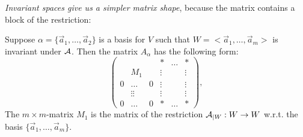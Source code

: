 \emph{Invariant spaces give us a simpler matrix shape}, because the matrix contains a block of the restriction:

\begin{theorem}
    Suppose $\alpha = \{\vec{a}_1, \dots, \vec{a}_2\}$ is a basis for $V$ such that $W = <\vec{a}_1, \dots, \vec{a}_m>$ is invariant under $\mathcal{A}$. Then the matrix $A_\alpha$ has the following form:
    $$\begin{pmatrix} & & & * & \dots & * \\
            & M_1 & &  \vdots & & \vdots \\
        0 & \dots & 0 & \vdots & & \vdots \\
          & \vdots\vdots & & \vdots & & \vdots \\
    0 & \dots & 0 & * & \dots & * \end{pmatrix},$$
    The $m \times m$-matrix $M_1$ is the matrix of the restriction $\mathcal{A}_{|W}: W \to W$ w.r.t. the basis $\{\vec{a}_1, \dots, \vec{a}_m\}$.
\end{theorem}

